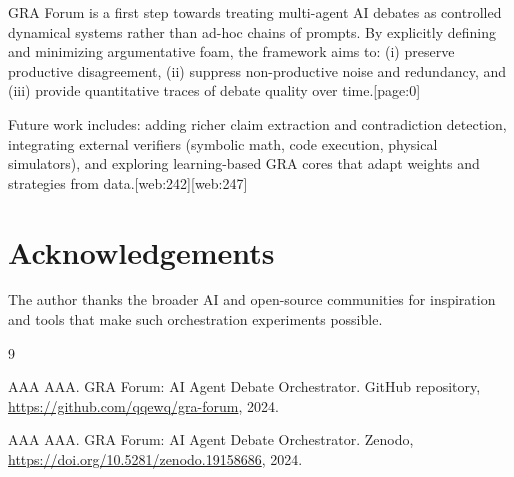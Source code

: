\documentclass[11pt]{article}
\begin{document}
GRA Forum is a first step towards treating multi-agent AI debates as controlled dynamical systems rather than ad-hoc chains of prompts.
By explicitly defining and minimizing argumentative foam, the framework aims to:
(i) preserve productive disagreement,
(ii) suppress non-productive noise and redundancy,
and (iii) provide quantitative traces of debate quality over time.[page:0]

Future work includes:
adding richer claim extraction and contradiction detection,
integrating external verifiers (symbolic math, code execution, physical simulators),
and exploring learning-based GRA cores that adapt weights and strategies from data.[web:242][web:247]

\section*{Acknowledgements}

The author thanks the broader AI and open-source communities for inspiration and tools that make such orchestration experiments possible.


\begin{thebibliography}{9}

AAA AAA.
\newblock GRA Forum: AI Agent Debate Orchestrator.
\newblock GitHub repository, \url{https://github.com/qqewq/gra-forum}, 2024.

AAA AAA.
\newblock GRA Forum: AI Agent Debate Orchestrator.
\newblock Zenodo, \url{https://doi.org/10.5281/zenodo.19158686}, 2024.

\end{thebibliography}
\end{document}
